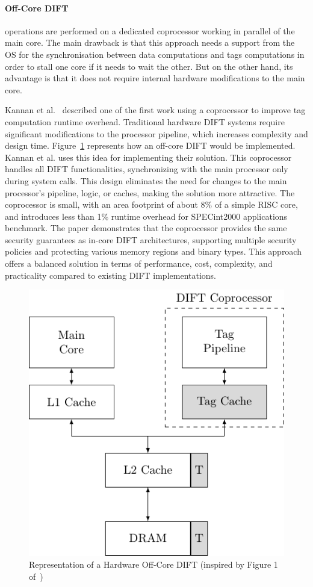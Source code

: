 \paragraph{Off-Core DIFT} operations are performed on a dedicated coprocessor working in parallel of the main core.
The main drawback is that this approach needs a support from the OS for the synchronisation between data computations and tags computations in order to stall one core if it needs to wait the other. But on the other hand, its advantage is that it does not require internal hardware modifications to the main core.

Kannan et al.~\cite{KDK-09-dsn} described one of the first work using a coprocessor to improve tag computation runtime overhead. Traditional hardware DIFT systems require significant modifications to the processor pipeline, which increases complexity and design time. Figure~\ref{fig:offcore_dift} represents how an off-core DIFT would be implemented. Kannan et al. uses this idea for implementing their solution.
This coprocessor handles all DIFT functionalities, synchronizing with the main processor only during system calls. This design eliminates the need for changes to the main processor's pipeline, logic, or caches, making the solution more attractive. The coprocessor is small, with an area footprint of about 8\% of a simple RISC core, and introduces less than 1\% runtime overhead for SPECint2000 applications benchmark. The paper demonstrates that the coprocessor provides the same security guarantees as in-core DIFT architectures, supporting multiple security policies and protecting various memory regions and binary types. This approach offers a balanced solution in terms of performance, cost, complexity, and practicality compared to existing DIFT implementations.

\begin{figure}[ht]
    \centering
    \includegraphics{c2_soa/img/offcore.pdf}
    \caption{Representation of a Hardware Off-Core DIFT (inspired by Figure 1 of~\cite{KDK-09-dsn})}
    \label{fig:offcore_dift}
\end{figure}

